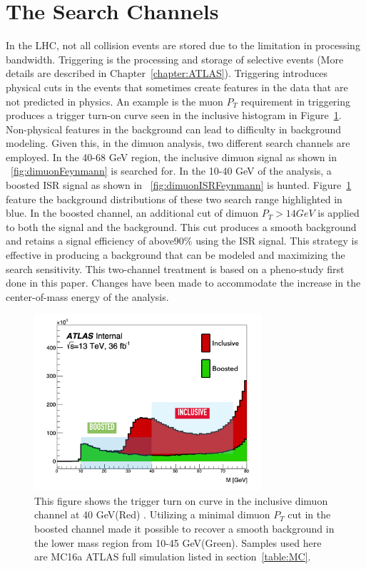 \section{The Search Channels}
In the LHC, not all collision events are stored due to the limitation in processing bandwidth. Triggering is the processing and storage of selective events (More details are described in Chapter~\ref{chapter:ATLAS}). Triggering introduces physical cuts in the events that sometimes create features in the data that are not predicted in physics. An example is the muon $P_{T}$ requirement in triggering produces a trigger turn-on curve seen in the inclusive histogram in Figure~\ref{fig:turnon}.
Non-physical features in the background can lead to difficulty in background modeling. Given this, in the dimuon analysis, two different search channels are employed. In the 40-68 GeV region, the inclusive dimuon signal as shown in ~\ref{fig:dimuonFeynmann} is searched for. In the 10-40 GeV of the analysis, a boosted ISR signal as shown in ~\ref{fig:dimuonISRFeynmann} is hunted. Figure~\ref{fig:turnon} feature the background distributions of these two search range highlighted in blue. In the
boosted channel, an additional cut of dimuon $P_{T}>14 GeV$ is applied to both the signal and the background. This cut produces a smooth background and retains a signal efficiency of above$ 90\%$ using the ISR signal. This strategy is effective in producing a background that can be modeled and maximizing the search sensitivity. 
This two-channel treatment is based on a pheno-study first done in this paper\cite{2014}. Changes have been made to accommodate the increase in the center-of-mass energy of the analysis. 

\begin{figure}[!htb]
    \begin{center}
        \includegraphics[width=0.75\textwidth]{figures/chapter_dimuon/turnon}
        \caption{
        This figure shows the trigger turn on curve in the inclusive dimuon channel at 40 GeV(Red) . Utilizing a minimal dimuon $P_{T}$ cut in the boosted channel made it possible to recover a smooth background in the lower mass region from 10-45 GeV(Green). Samples used here are MC16a ATLAS full simulation listed in section~\ref{table:MC}.
        }
        \label{fig:turnon}
    \end{center}
\end{figure}
\FloatBarrier

